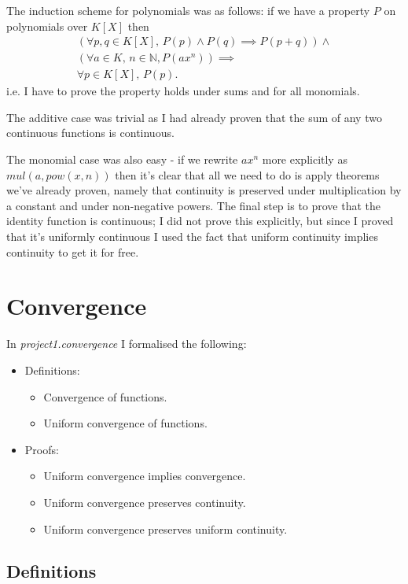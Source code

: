 \documentclass[a4paper, twoside, 11pt]{article}
\theoremstyle{definition}
\theoremstyle{plain}
\theoremstyle{remark}
\begin{document}
The induction scheme for polynomials was as follows: if we have a property $P$ on polynomials over $K[X]$ then
\begin{align*}
    \left(\forall p,q \in K[X],\, P(p) \wedge P(q) \implies P(p + q)\right) \wedge \\
    \left(\forall a \in K,\,n \in \mathbb{N}, P(ax^{n})\right) \implies \\
    \forall p \in K[X],\,P(p)
.\end{align*}
i.e. I have to prove the property holds under sums and for all monomials.

The additive case was trivial as I had already proven that the sum of any two continuous functions is continuous.

The monomial case was also easy - if we rewrite $ax^{n}$ more explicitly as $mul(a, pow(x, n))$ then it's clear that all we need to do is apply theorems we've already proven, namely that continuity is preserved under multiplication by a constant and under non-negative powers. The final step is to prove that the identity function is continuous; I did not prove this explicitly, but since I proved that it's uniformly continuous I used the fact that uniform continuity implies continuity to get it for free.


\section{Convergence}

In \emph{project1.convergence} I formalised the following:
\begin{itemize}
    \item Definitions:
    \begin{itemize}
        \item Convergence of functions.
        \item Uniform convergence of functions.
    \end{itemize}
    \item Proofs:
    \begin{itemize}
        \item Uniform convergence implies convergence.
        \item Uniform convergence preserves continuity.
        \item Uniform convergence preserves uniform continuity.
    \end{itemize}
\end{itemize}


\subsection{Definitions}
\end{document}
